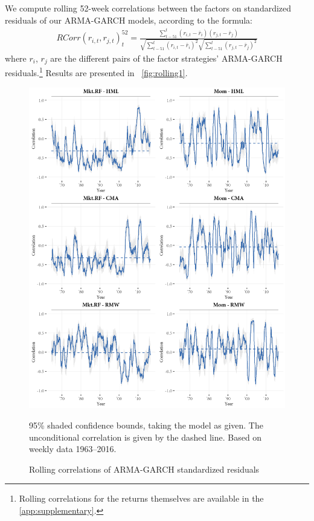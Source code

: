 We compute rolling 52-week correlations between the factors on standardized residuals of our ARMA-GARCH models, according to the formula: 
\begin{align}
    RCorr(r_{i, t}, r_{j, t})_t^{52} = \frac{\sum^{t}_{t-51}(r_{i, t} - \bar{r}_i)(r_{j,t} - \bar{r}_j)}{\sqrt{\sum^{t}_{t-51} (r_{i,t} - \bar{r}_i)^2} \sqrt{\sum^{t}_{t-51} (r_{j,t} - \bar{r}_j)^2}}
\end{align}
where $r_i$, $r_j$ are the different pairs of the factor strategies' ARMA-GARCH residuals.\footnote{Rolling correlations for the returns themselves are available in the \autoref{app:supplementary}.} Results are presented in ~\autoref{fig:rolling1}.
\begin{figure}[!ht]
  \centering
  \includegraphics[scale=1]{graphics/rolling1.png}
  \footnotesize
  \caption{Rolling correlations of ARMA-GARCH standardized residuals}
  \begin{longcaption}
    95\% shaded confidence bounds, taking the model as given. The unconditional correlation is given by the dashed line. Based on weekly data 1963--2016.
  \end{longcaption}
  \label{fig:rolling1}
\end{figure}
